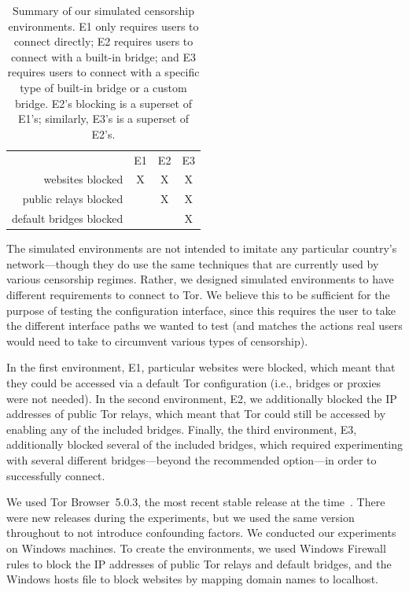 \documentclass[USenglish,oneside,twocolumn]{article}
\begin{document}
\begin{table}[t]
\centering
\begin{tabular}{r c c c}
& E1 & E2 & E3 \\
websites blocked & X & X & X \\
public relays blocked & & X & X \\
default bridges blocked & & & X \\
\end{tabular}
\caption{
Summary of our simulated censorship environments.
E1 only requires users to connect directly;
E2 requires users to connect with a built-in bridge;
and E3 requires users to connect with a specific type of built-in bridge
or a custom bridge.
E2's blocking is a superset of E1's;
similarly, E3's is a superset of E2's.
}
\label{tab:environments}
\end{table}

The simulated environments are not intended to imitate any particular country's network---though they do use the same techniques that are currently used by various censorship regimes. Rather, we designed simulated environments to have different requirements to connect to Tor. We believe this to be sufficient for the purpose of testing the configuration interface, since this requires the user to take the different interface paths we wanted to test (and matches the actions real users would need to take to circumvent various types of censorship).

In the first environment, E1, particular websites were blocked, which meant that they could be accessed via a default Tor configuration (i.e., bridges or proxies were not needed). In the second environment, E2, we additionally blocked the IP addresses of public Tor relays, which meant that Tor could still be accessed by enabling any of the included bridges. Finally, the third environment, E3, additionally blocked several of the included bridges, which required experimenting with several different bridges---beyond the recommended option---in order to successfully connect.

We used Tor Browser~5.0.3, the most recent stable release at the time~\cite{torbrowser-503}.
There were new releases during the experiments, but we used the same version throughout to not introduce confounding factors. We conducted our experiments on Windows machines. To create the environments, we used Windows Firewall rules to block the IP addresses of public Tor relays and default bridges, and the Windows hosts file to block websites by mapping domain names to localhost. 
\end{document}
